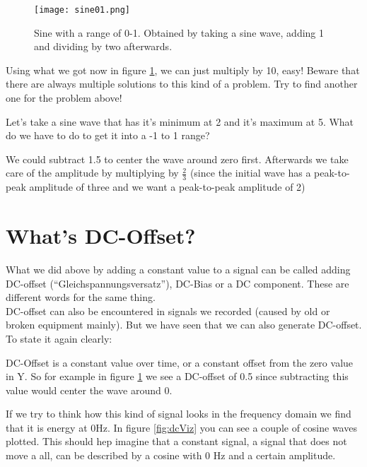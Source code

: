 \begin{figure}[h!]
 	\centering
 	\texttt{[image: sine01.png]}
 	\caption[sine 0 to 1]
 	{Sine with a range of 0-1. Obtained by taking a sine wave, adding 1 and dividing by two afterwards.}
 	\label{fig:sine01}
 \end{figure} 

Using what we got now in figure \ref{fig:sine01}, we can just multiply by 10, easy! Beware that there are always multiple solutions to this kind of a problem. Try to find another one for the problem above!

\begin{question}
Let's take a sine wave that has it's minimum at 2 and it's maximum at 5. What do we have to do to get it into a -1 to 1 range?
\end{question}
\begin{Answer}
We could subtract 1.5 to center the wave around zero first. Afterwards we take care of the amplitude by multiplying by $\frac{2}{3}$ (since the initial wave has a peak-to-peak amplitude of three and we want a peak-to-peak amplitude of 2)
\end{Answer}



\section{What's DC-Offset?}

What we did above by adding a constant value to a signal can be called adding DC-offset (``Gleichspannungsversatz''), DC-Bias or a DC component. These are different words for the same thing.\\
DC-offset can also be encountered in signals we recorded (caused by old or broken equipment mainly). But we have seen that we can also generate DC-offset.\\
To state it again clearly: 
\begin{framed}
DC-Offset is a constant value over time, or a constant offset from the zero value in Y. So for example in figure \ref{fig:sine01} we see a DC-offset of 0.5 since subtracting this value would center the wave around 0.
\end{framed}
If we try to think how this kind of signal looks in the frequency domain we find that it is energy at 0Hz. In figure \ref{fig:dcViz} you can see a couple of cosine waves plotted. This should hep imagine that a constant signal, a signal that does not move a all, can be described by a cosine with 0 Hz and a certain amplitude.

